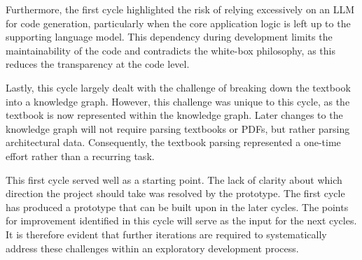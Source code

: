 Furthermore, the first cycle highlighted the risk of relying excessively on an LLM for code generation, particularly when the core application logic is left up to the supporting language model. This dependency during development limits the maintainability of the code and contradicts the white-box philosophy, as this reduces the transparency at the code level.

Lastly, this cycle largely dealt with the challenge of breaking down the textbook into a knowledge graph. However, this challenge was unique to this cycle, as the textbook is now represented within the knowledge graph. Later changes to the knowledge graph will not require parsing textbooks or PDFs, but rather parsing architectural data. Consequently, the textbook parsing represented a one-time effort rather than a recurring task.


This first cycle served well as a starting point. The lack of clarity about which direction the project should take was resolved by the prototype. The first cycle has produced a prototype that can be built upon in the later cycles. The points for improvement identified in this cycle will serve as the input for the next cycles. It is therefore evident that further iterations are required to systematically address these challenges within an exploratory development process.

